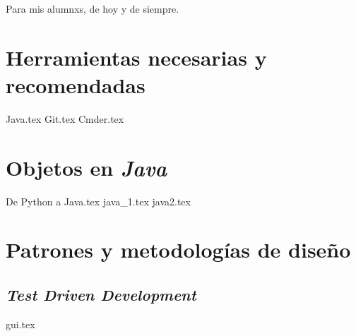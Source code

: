 \documentclass[12pt]{book}
\begin{document}
  
  \begin{center}
      \thispagestyle{empty}
      \vspace*{\fill}
      Para mis alumnxs, de hoy y de siempre.
      \vspace*{\fill}
  \end{center}
  \clearpage
  
  \tableofcontents

  \mainmatter
  \part{Herramientas necesarias y recomendadas}
    {Java.tex}
    {Git.tex}
    {Cmder.tex}
  \part{Objetos en \textit{Java}}
    
    {De Python a Java.tex}
    {java_1.tex}
    {java2.tex}
  \part{Patrones y metodologías de diseño}
    \chapter{\textit{Test Driven Development}}
      \label{ch:tdd}
    {gui.tex}
\end{document}
